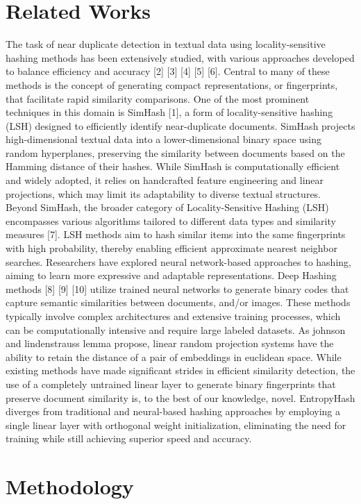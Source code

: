 \documentclass{article}
\begin{document}
\section{Related Works}
\label{sec:headings}
The task of near duplicate detection in textual data using locality-sensitive hashing methods has been extensively studied, with various approaches developed to balance efficiency and accuracy [2] [3] [4] [5] [6]. Central to many of these methods is the concept of generating compact representations, or fingerprints, that facilitate rapid similarity comparisons. One of the most prominent techniques in this domain is SimHash [1], a form of locality-sensitive hashing (LSH) designed to efficiently identify near-duplicate documents. SimHash projects high-dimensional textual data into a lower-dimensional binary space using random hyperplanes, preserving the similarity between documents based on the Hamming distance of their hashes. While SimHash is computationally efficient and widely adopted, it relies on handcrafted feature engineering and linear projections, which may limit its adaptability to diverse textual structures. Beyond SimHash, the broader category of Locality-Sensitive Hashing (LSH) encompasses various algorithms tailored to different data types and similarity measures [7]. LSH methods aim to hash similar items into the same fingerprints with high probability, thereby enabling efficient approximate nearest neighbor searches.
Researchers have explored neural network-based approaches to hashing, aiming to learn more expressive and adaptable representations. Deep Hashing methods [8] [9] [10] utilize trained neural networks to generate binary codes that capture semantic similarities between documents, and/or images. These methods typically involve complex architectures and extensive training processes, which can be computationally intensive and require large labeled datasets.
As johnson and lindenstrauss lemma propose, linear random projection systems have the ability to retain the distance of a pair of embeddings in euclidean space. While existing methods have made significant strides in efficient similarity detection, the use of a completely untrained linear layer to generate binary fingerprints that preserve document similarity is, to the best of our knowledge, novel. EntropyHash diverges from traditional and neural-based hashing approaches by employing a single linear layer with orthogonal weight initialization, eliminating the need for training while still achieving superior speed and accuracy.


\section{Methodology}
\label{sec:headings}
\end{document}
